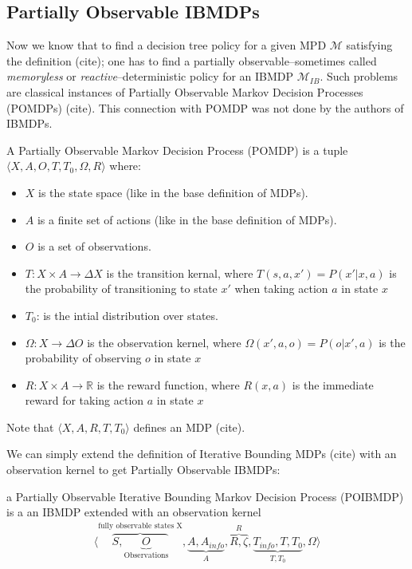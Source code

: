 \subsection{Partially Observable IBMDPs}

Now we know that to find a decision tree policy for a given MPD $\mathcal{M}$ satisfying the definition (cite); one has to find a partially observable--sometimes called \textit{memoryless} or \textit{reactive}--deterministic policy for an IBMDP $\mathcal{M}_{IB}$.
Such problems are classical instances of Partially Observable Markov Decision Processes (POMDPs) (cite). This connection with POMDP was not done by the authors of IBMDPs. 

\begin{definition}
A Partially Observable Markov Decision Process (POMDP) is a tuple $\langle X, A, O, T, T_0, \Omega, R\rangle$ where:
\begin{itemize}
    \item $X$ is the state space (like in the base definition of MDPs).
    \item $A$ is a finite set of actions (like in the base definition of MDPs).
    \item $O$ is a set of observations.
    \item $T: X \times A \rightarrow \Delta X$ is the transition kernal, where $T(s, a, x') = P(x'|x, a)$ is the probability of transitioning to state $x'$ when taking action $a$ in state $x$
    \item $T_0$: is the intial distribution over states. 
    \item $\Omega: X \rightarrow \Delta O$ is the observation kernel, where $\Omega(x', a, o) = P(o|x', a)$ is the probability of observing $o$ in state $x$
    \item $R: X \times A \rightarrow \mathbb{R}$ is the reward function, where $R(x, a)$ is the immediate reward for taking action $a$ in state $x$
\end{itemize}
Note that $\langle X, A, R, T, T_0 \rangle$ defines an MDP (cite).
\end{definition}

We can simply extend the definition of Iterative Bounding MDPs (cite) with an observation kernel to get Partially Observable IBMDPs:
\begin{definition} a Partially Observable Iterative Bounding Markov Decision Process (POIBMDP) is a an IBMDP extended with an observation kernel 
    \begin{align*}
        \langle \overbrace{S, \underbrace{O}_{\text{Observations}}}^{\text{fully observable states X}}, \underbrace{A, A_{info}}_{A}, \overbrace{R, \zeta}^{R}, \underbrace{T_{info}, T, T_0}_{T, T_0}, \Omega \rangle
    \end{align*}
\end{definition}

